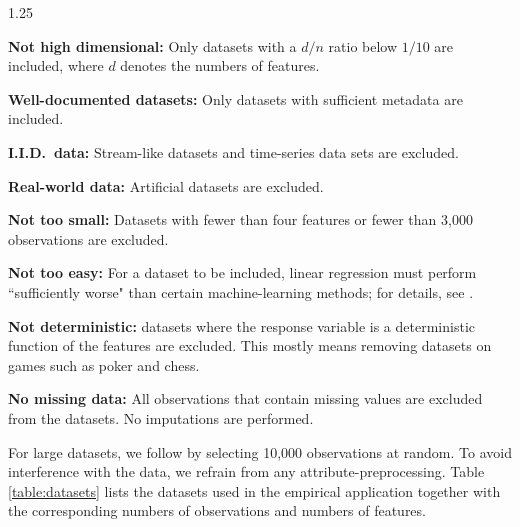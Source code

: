 \documentclass[12pt]{article}
\newenvironment{packed_itemize}{
\begin{itemize}
  \setlength{\itemsep}{1pt}
  \setlength{\parskip}{0pt} 
  \setlength{\parsep}{0pt}
}{\end{itemize}}
\numberwithin{equation}{section}
\theoremstyle{plain}
\begin{document}
\begin{spacing}{1.25}
\begin{packed_itemize}
\item \textbf{Not high dimensional:} Only datasets with a $d/n$ ratio below $1/10$ are included, where $d$ denotes the numbers of features.
  
\item \textbf{Well-documented datasets:} Only datasets with
  sufficient metadata are included.

\item \textbf{I.I.D.~data:} Stream-like datasets and time-series data
  sets are excluded.

\item \textbf{Real-world data:} Artificial datasets are excluded.
  
\item \textbf{Not too small:} Datasets with fewer than four features or fewer than  3,000 observations are excluded.
  
\item \textbf{Not too easy:}
For a dataset to be included, linear regression must perform
``sufficiently worse" than certain machine-learning methods; for details, see \cite{grinsztajn:2022}.

\item \textbf{Not deterministic:} datasets where the response
  variable is a deterministic function of the features are excluded.
  This mostly means removing datasets on games such as poker and chess.

\item \textbf{No missing data:} All observations that contain missing
  values are excluded from the datasets. No imputations are performed.

\end{packed_itemize} 
For large datasets, we follow \citet{grinsztajn:2022} by 
selecting 10,000 observations at random. To avoid interference with the
data, we refrain from any attribute-preprocessing. Table \ref{table:datasets} lists the datasets used in the empirical application together with the
corresponding numbers of observations and numbers of features.


\end{spacing}
\end{document}
